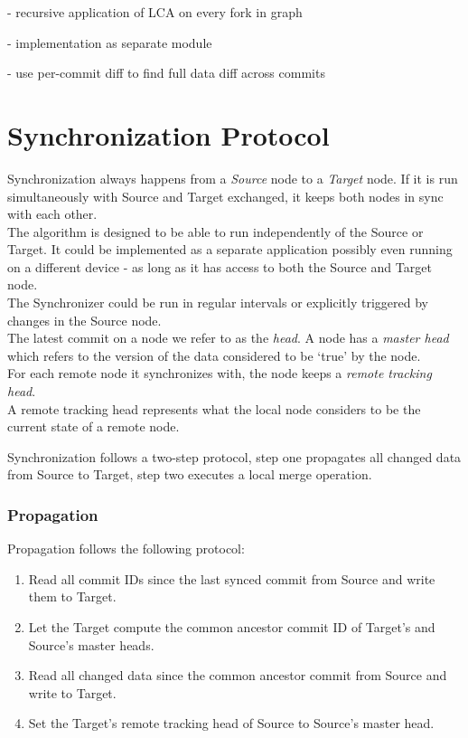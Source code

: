 - recursive application of LCA on every fork in graph

- implementation as separate module

- use per-commit diff to find full data diff across commits

\section{Synchronization Protocol}
\label{sec:main.protocol}
Synchronization always happens from a \emph{Source} node to a \emph{Target} node.
If it is run simultaneously with Source and Target exchanged, it keeps both nodes in sync with each other.\\
The algorithm is designed to be able to run independently of the Source or Target.
It could be implemented as a separate application possibly even running on a different device - as long as it has access to both the Source and Target node.\\
The Synchronizer could be run in regular intervals or explicitly triggered by changes in the Source node.\\

The latest commit on a node we refer to as the \emph{head}.
A node has a \emph{master head} which refers to the version of the data considered to be `true' by the node.\\
For each remote node it synchronizes with, the node keeps a \emph{remote tracking head}.\\
A remote tracking head represents what the local node considers to be the current state of a remote node.

Synchronization follows a two-step protocol, step one propagates all changed data from Source to Target, step two executes a local merge operation.

\subsubsection{Propagation}
Propagation follows the following protocol:

\begin{enumerate}
\item Read all commit IDs since the last synced commit from Source and write them to Target.
\item Let the Target compute the common ancestor commit ID of Target's and Source's master heads.
\item Read all changed data since the common ancestor commit from Source and write to Target.
\item Set the Target's remote tracking head of Source to Source's master head.
\end{enumerate}

